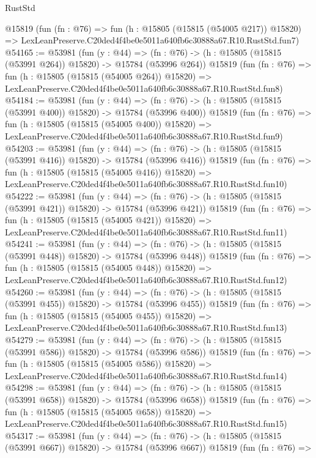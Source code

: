 \begin{lexlean}{RustStd}
\begin{coremodule}
    @15819
    (fun (fn : @76) =>
    fun (h : @15805 (@15815 (@54005 @217)) @15820) =>
    LexLeanPreserve.C20ded4f4be0e5011a640fb6c30888a67.R10.RustStd.fun7)
@54165 := @53981
    (fun (y : @44) =>
    (fn : @76) -> (h : @15805 (@15815 (@53991 @264)) @15820) -> @15784 (@53996 @264))
    @15819
    (fun (fn : @76) =>
    fun (h : @15805 (@15815 (@54005 @264)) @15820) =>
    LexLeanPreserve.C20ded4f4be0e5011a640fb6c30888a67.R10.RustStd.fun8)
@54184 := @53981
    (fun (y : @44) =>
    (fn : @76) -> (h : @15805 (@15815 (@53991 @400)) @15820) -> @15784 (@53996 @400))
    @15819
    (fun (fn : @76) =>
    fun (h : @15805 (@15815 (@54005 @400)) @15820) =>
    LexLeanPreserve.C20ded4f4be0e5011a640fb6c30888a67.R10.RustStd.fun9)
@54203 := @53981
    (fun (y : @44) =>
    (fn : @76) -> (h : @15805 (@15815 (@53991 @416)) @15820) -> @15784 (@53996 @416))
    @15819
    (fun (fn : @76) =>
    fun (h : @15805 (@15815 (@54005 @416)) @15820) =>
    LexLeanPreserve.C20ded4f4be0e5011a640fb6c30888a67.R10.RustStd.fun10)
@54222 := @53981
    (fun (y : @44) =>
    (fn : @76) -> (h : @15805 (@15815 (@53991 @421)) @15820) -> @15784 (@53996 @421))
    @15819
    (fun (fn : @76) =>
    fun (h : @15805 (@15815 (@54005 @421)) @15820) =>
    LexLeanPreserve.C20ded4f4be0e5011a640fb6c30888a67.R10.RustStd.fun11)
@54241 := @53981
    (fun (y : @44) =>
    (fn : @76) -> (h : @15805 (@15815 (@53991 @448)) @15820) -> @15784 (@53996 @448))
    @15819
    (fun (fn : @76) =>
    fun (h : @15805 (@15815 (@54005 @448)) @15820) =>
    LexLeanPreserve.C20ded4f4be0e5011a640fb6c30888a67.R10.RustStd.fun12)
@54260 := @53981
    (fun (y : @44) =>
    (fn : @76) -> (h : @15805 (@15815 (@53991 @455)) @15820) -> @15784 (@53996 @455))
    @15819
    (fun (fn : @76) =>
    fun (h : @15805 (@15815 (@54005 @455)) @15820) =>
    LexLeanPreserve.C20ded4f4be0e5011a640fb6c30888a67.R10.RustStd.fun13)
@54279 := @53981
    (fun (y : @44) =>
    (fn : @76) -> (h : @15805 (@15815 (@53991 @586)) @15820) -> @15784 (@53996 @586))
    @15819
    (fun (fn : @76) =>
    fun (h : @15805 (@15815 (@54005 @586)) @15820) =>
    LexLeanPreserve.C20ded4f4be0e5011a640fb6c30888a67.R10.RustStd.fun14)
@54298 := @53981
    (fun (y : @44) =>
    (fn : @76) -> (h : @15805 (@15815 (@53991 @658)) @15820) -> @15784 (@53996 @658))
    @15819
    (fun (fn : @76) =>
    fun (h : @15805 (@15815 (@54005 @658)) @15820) =>
    LexLeanPreserve.C20ded4f4be0e5011a640fb6c30888a67.R10.RustStd.fun15)
@54317 := @53981
    (fun (y : @44) =>
    (fn : @76) -> (h : @15805 (@15815 (@53991 @667)) @15820) -> @15784 (@53996 @667))
    @15819
    (fun (fn : @76) =>

\end{coremodule}
\end{lexlean}
